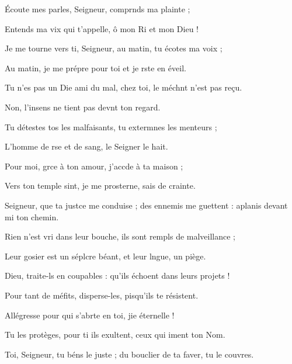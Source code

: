 \item Écoute mes parles, Seigneur,\psstar{} comprnds ma plainte ;
\item Entends ma vix qui t’appelle,\psstar{} ô mon Ri et mon Dieu !
\item Je me tourne vers ti, Seigneur,\psstar{} au matin, tu écotes ma voix ;
\item Au matin, je me prépre pour toi\psstar{} et je rste en éveil.
\item Tu n’es pas un Die ami du mal,\psstar{} chez toi, le méchnt n’est pas reçu.
\item Non, l’insens ne tient pas\psstar{} devnt ton regard.
\item Tu détestes tos les malfaisants,\psstar{} tu extermnes les menteurs ;
\item L’homme de rse et de sang,\psstar{} le Seigner le hait.
\item Pour moi, grce à ton amour,\psstar{} j’accde à ta maison ;
\item Vers ton temple sint, je me prosterne,\psstar{} sais de crainte. 
\item Seigneur, que ta justce me conduise ;\psstar{} des ennemis me guettent : aplanis devant mi ton chemin.
\item Rien n’est vri dans leur bouche,\psstar{} ils sont rempls de malveillance ;
\item Leur gosier est un séplcre béant,\psstar{} et leur lngue, un piège.
\item Dieu, traite-ls en coupables :\psstar{} qu’ils échoent dans leurs projets !
\item Pour tant de méfits, disperse-les,\psstar{} pisqu’ils te résistent.
\item Allégresse pour qui s’abrte en toi,\psstar{} jie éternelle !
\item Tu les protèges, pour ti ils exultent,\psstar{} ceux qui iment ton Nom.
\item Toi, Seigneur, tu béns le juste ;\psstar{} du bouclier de ta faver, tu le couvres.